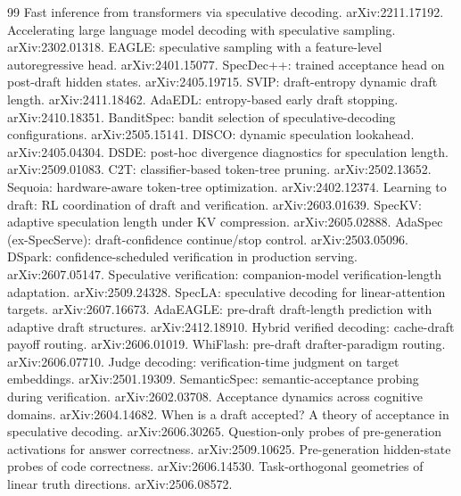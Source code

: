 \documentclass[11pt]{article}
\begin{document}
\begin{thebibliography}{99}
\small
 Fast inference from transformers via speculative decoding.
arXiv:2211.17192.
 Accelerating large language model decoding with speculative
sampling. arXiv:2302.01318.
 EAGLE: speculative sampling with a feature-level
autoregressive head. arXiv:2401.15077.
 SpecDec++: trained acceptance head on post-draft hidden
states. arXiv:2405.19715.
 SVIP: draft-entropy dynamic draft length. arXiv:2411.18462.
 AdaEDL: entropy-based early draft stopping. arXiv:2410.18351.
 BanditSpec: bandit selection of speculative-decoding
configurations. arXiv:2505.15141.
 DISCO: dynamic speculation lookahead. arXiv:2405.04304.
 DSDE: post-hoc divergence diagnostics for speculation length.
arXiv:2509.01083.
 C2T: classifier-based token-tree pruning. arXiv:2502.13652.
 Sequoia: hardware-aware token-tree optimization.
arXiv:2402.12374.
 Learning to draft: RL coordination of draft and verification.
arXiv:2603.01639.
 SpecKV: adaptive speculation length under KV compression.
arXiv:2605.02888.
 AdaSpec (ex-SpecServe): draft-confidence continue/stop
control. arXiv:2503.05096.
 DSpark: confidence-scheduled verification in production
serving. arXiv:2607.05147.
 Speculative verification: companion-model verification-length
adaptation. arXiv:2509.24328.
 SpecLA: speculative decoding for linear-attention targets.
arXiv:2607.16673.
 AdaEAGLE: pre-draft draft-length prediction with adaptive
draft structures. arXiv:2412.18910.
 Hybrid verified decoding: cache-draft payoff routing.
arXiv:2606.01019.
 WhiFlash: pre-draft drafter-paradigm routing.
arXiv:2606.07710.
 Judge decoding: verification-time judgment on target
embeddings. arXiv:2501.19309.
 SemanticSpec: semantic-acceptance probing during
verification. arXiv:2602.03708.
 Acceptance dynamics across cognitive domains.
arXiv:2604.14682.
 When is a draft accepted? A theory of acceptance in
speculative decoding. arXiv:2606.30265.
 Question-only probes of pre-generation activations for
answer correctness. arXiv:2509.10625.
 Pre-generation hidden-state probes of code correctness.
arXiv:2606.14530.
 Task-orthogonal geometries of linear truth directions.
arXiv:2506.08572.
\end{thebibliography}
\end{document}
